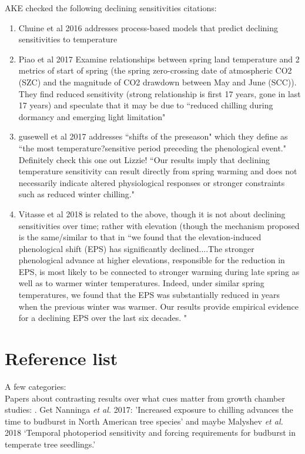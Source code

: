 \documentclass[11pt,letter]{article}
\begin{document}
AKE checked the following declining sensitivities citations:
\begin{enumerate} 
\item Chuine et al 2016 \citet{chuine2016} addresses process-based models that predict declining sensitivities to temperature
\item Piao et al 2017 \citet{piao2017} Examine relationships between spring land temperature and 2 metrics of start of spring (the spring zero-crossing date of atmospheric CO2 (SZC) and the magnitude of CO2 drawdown between May and June (SCC)). They find reduced sensitivity (strong relationship is first 17 years, gone in last 17 years) and speculate that it may be due to ``reduced chilling during dormancy and emerging light limitation"
\item gusewell et al 2017 \citet{gusewell2017} addresses ``shifts of the preseason" which they define as ``the most temperature?sensitive period preceding the phenological event." Definitely check this one out Lizzie!  ``Our results imply that declining temperature sensitivity can result directly from spring warming and does not necessarily indicate altered physiological responses or stronger constraints such as reduced winter chilling."
\item Vitasse et al 2018 \citet{vitasse2018} is related to the above, though it is not about declining sensitivities over time; rather with elevation (though the mechanism proposed is the same/similar to that in \citet{gusewell2017} ``we found that the elevation-induced phenological shift (EPS) has significantly declined....The stronger phenological advance at higher elevations, responsible for the reduction in EPS, is most likely to be connected to stronger warming during late spring as well as to warmer winter temperatures. Indeed, under similar spring temperatures, we found that the EPS was substantially reduced in years when the previous winter was warmer. Our results provide empirical evidence for a declining EPS over the last six decades. "
\end{enumerate}

\section{Reference list}

A few categories:\\

Papers about contrasting results over what cues matter from growth chamber studies: \cite{Basler:2012,Basler:2014aa,Caffarra:2011qf,Caffarra:2011a,Caffarra:2011b,Heide:2005aa,koerner2010b,Laube:2014a,vitasse2013,zohner2016}. Get Nanninga \emph{et al.} 2017: 'Increased exposure to chilling advances the time to budburst in North American tree species' and maybe Malyshev \emph{et al.} 2018 `Temporal photoperiod sensitivity and forcing requirements for budburst in temperate tree seedlings.'\\
\end{document}
